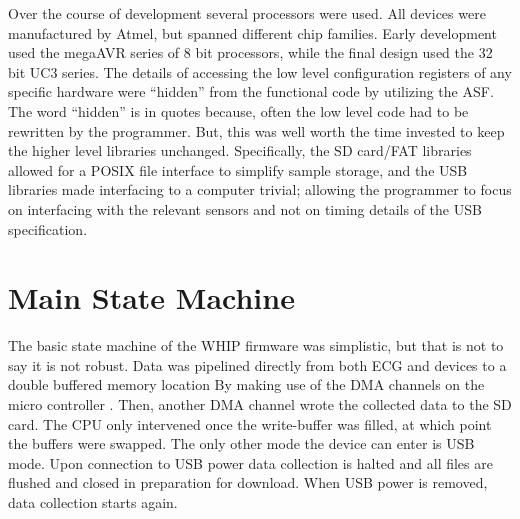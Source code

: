 Over the course of development several processors were used. All devices were manufactured by Atmel, but spanned different chip families. Early development used the megaAVR series of 8 bit processors, while the final design used the 32 bit UC3 series. The details of accessing the low level configuration registers of any specific hardware were ``hidden'' from the functional code by utilizing the ASF. The word ``hidden'' is in quotes because, often the low level code had to be rewritten by the programmer. But, this was well worth the time invested to keep the higher level libraries unchanged. Specifically, the SD card/FAT libraries allowed for a POSIX file interface to simplify sample storage, and the USB libraries made interfacing to a computer trivial; allowing the programmer to focus on interfacing with the relevant sensors and not on timing details of the USB specification.

\section{Main State Machine}

The basic state machine of the WHIP firmware was simplistic, but that is not to say it is not robust. Data was pipelined directly from both ECG and  devices to a double buffered memory location By making use of the DMA channels on the micro controller . Then, another DMA channel wrote the collected data to the SD card. The CPU only intervened once the write-buffer was filled, at which point the buffers were swapped. The only other mode the device can enter is USB mode. Upon connection to USB power data collection is halted and all files are flushed and closed in preparation for download. When USB power is removed, data collection starts again. 

